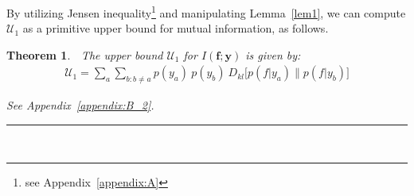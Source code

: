 \documentclass[10pt,journal,compsoc]{IEEEtran}
\newcommand{\BlackBox}{\rule{1.5ex}{1.5ex}}  %
\newenvironment{proof}{\par\noindent{\bf Proof\ }}{\hfill\BlackBox\\[2mm]}
\newtheorem{theorem}{Theorem}
\begin{document}
By utilizing Jensen inequality\footnote{see Appendix~\ref{appendix:A}} and manipulating Lemma~\ref{lem1}, we can compute $\mathcal{U}_1$ as a primitive upper bound for mutual information, as follows.
\begin{theorem} \label{th1}
	$\;$ The upper bound $\mathcal{U}_1$ for $I(\textbf{f};\textbf{y})$ is given by:
	\begin{align}
	\mathcal{U}_1 = \sum_a \sum_{b: b\neq a} p(y_a)\ p(y_b)\ D_{kl} \big[ p(f|y_a) \| p(f|y_b) \big]
	\end{align}
	\begin{proof}
		See Appendix~\ref{appendix:B_2}.
	\end{proof}
\end{theorem}%
\end{document}
